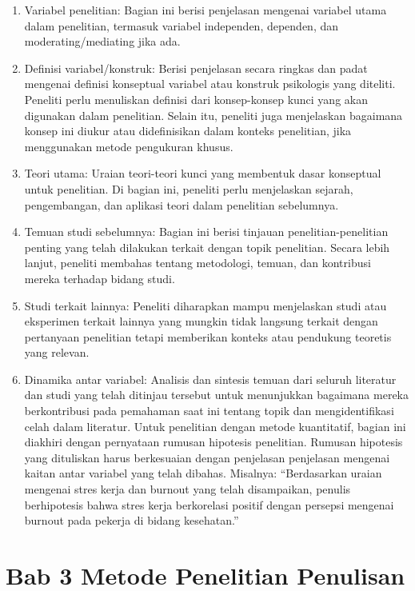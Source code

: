 \documentclass[
  indonesian,
  letterpaper,
]{scrbook}
\providecommand{\tightlist}{%
  \setlength{\itemsep}{0pt}\setlength{\parskip}{0pt}}
\begin{document}
\begin{enumerate}
\def\labelenumi{\arabic{enumi}.}
\tightlist
\item
  Variabel penelitian: Bagian ini berisi penjelasan mengenai variabel
  utama dalam penelitian, termasuk variabel independen, dependen, dan
  moderating/mediating jika ada.
\item
  Definisi variabel/konstruk: Berisi penjelasan secara ringkas dan padat
  mengenai definisi konseptual variabel atau konstruk psikologis yang
  diteliti. Peneliti perlu menuliskan definisi dari konsep-konsep kunci
  yang akan digunakan dalam penelitian. Selain itu, peneliti juga
  menjelaskan bagaimana konsep ini diukur atau didefinisikan dalam
  konteks penelitian, jika menggunakan metode pengukuran khusus.
\item
  Teori utama: Uraian teori-teori kunci yang membentuk dasar konseptual
  untuk penelitian. Di bagian ini, peneliti perlu menjelaskan sejarah,
  pengembangan, dan aplikasi teori dalam penelitian sebelumnya.
\item
  Temuan studi sebelumnya: Bagian ini berisi tinjauan
  penelitian-penelitian penting yang telah dilakukan terkait dengan
  topik penelitian. Secara lebih lanjut, peneliti membahas tentang
  metodologi, temuan, dan kontribusi mereka terhadap bidang studi.
\item
  Studi terkait lainnya: Peneliti diharapkan mampu menjelaskan studi
  atau eksperimen terkait lainnya yang mungkin tidak langsung terkait
  dengan pertanyaan penelitian tetapi memberikan konteks atau pendukung
  teoretis yang relevan.
\item
  Dinamika antar variabel: Analisis dan sintesis temuan dari seluruh
  literatur dan studi yang telah ditinjau tersebut untuk menunjukkan
  bagaimana mereka berkontribusi pada pemahaman saat ini tentang topik
  dan mengidentifikasi celah dalam literatur. Untuk penelitian dengan
  metode kuantitatif, bagian ini diakhiri dengan pernyataan rumusan
  hipotesis penelitian. Rumusan hipotesis yang dituliskan harus
  berkesuaian dengan penjelasan penjelasan mengenai kaitan antar
  variabel yang telah dibahas. Misalnya: ``Berdasarkan uraian mengenai
  stres kerja dan burnout yang telah disampaikan, penulis berhipotesis
  bahwa stres kerja berkorelasi positif dengan persepsi mengenai burnout
  pada pekerja di bidang kesehatan.''
\end{enumerate}

\section{Bab 3 Metode Penelitian
Penulisan}\label{bab-3-metode-penelitian-penulisan}
\end{document}
